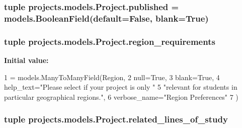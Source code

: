 \hypertarget{classprojects_1_1models_1_1_project_a486a7d980b96c990599a4ee3832aeda9}{
\subsubsection[{published}]{\setlength{\rightskip}{0pt plus 5cm}tuple projects.\-models.\-Project.\-published = models.\-Boolean\-Field(default=False, blank=True)\hspace{0.3cm}{\ttfamily [static]}}}\label{classprojects_1_1models_1_1_project_a486a7d980b96c990599a4ee3832aeda9}
\hypertarget{classprojects_1_1models_1_1_project_a603d1ad29d43186fbb0bcba4cf35132b}{
\subsubsection[{region\-\_\-requirements}]{\setlength{\rightskip}{0pt plus 5cm}tuple projects.\-models.\-Project.\-region\-\_\-requirements\hspace{0.3cm}{\ttfamily [static]}}}\label{classprojects_1_1models_1_1_project_a603d1ad29d43186fbb0bcba4cf35132b}
{\bfseries Initial value\-:}
\begin{DoxyCode}
1 = models.ManyToManyField(Region,
2                                                  null=\textcolor{keyword}{True},
3                                                  blank=\textcolor{keyword}{True},
4                                                  help\_text=\textcolor{stringliteral}{"Please select if your project is only "}
5                                                            \textcolor{stringliteral}{"relevant for students in particular
       geographical regions."},
6                                                  verbose\_name=\textcolor{stringliteral}{"Region Preferences"}
7     )
\end{DoxyCode}
\hypertarget{classprojects_1_1models_1_1_project_a8a35d7613094420176b855e33f7f6cc6}{
\subsubsection[{related\-\_\-lines\-\_\-of\-\_\-study}]{\setlength{\rightskip}{0pt plus 5cm}tuple projects.\-models.\-Project.\-related\-\_\-lines\-\_\-of\-\_\-study\hspace{0.3cm}{\ttfamily [static]}}}\label{classprojects_1_1models_1_1_project_a8a35d7613094420176b855e33f7f6cc6}
